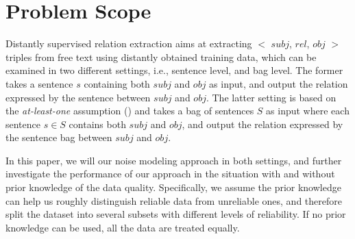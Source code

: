 \section{Problem Scope}
Distantly supervised relation extraction aims at extracting $<$ $subj$,  $rel$,  $obj$ $>$ triples from free text using distantly obtained training data, which can be examined in two different settings, i.e., sentence level, and bag level. The former  takes a sentence $s$ containing both $subj$ and $obj$ as input, and output the relation expressed by the sentence between $subj$ and $obj$. The latter setting is based on the \textit{at-least-one} assumption () and takes a bag of sentences $S$ as input where each sentence $s\in S$ contains both $subj$ and $obj$, and output  the relation expressed by the sentence bag between $subj$ and $obj$.

In this paper, we will  our noise modeling approach in both settings, and further investigate the performance of our approach in the situation with and without prior knowledge of the data quality. Specifically, we assume the prior knowledge can help us roughly distinguish reliable data from unreliable ones, and therefore split the dataset into several subsets with different levels of reliability. If no prior knowledge can be used, all the data are treated equally.



